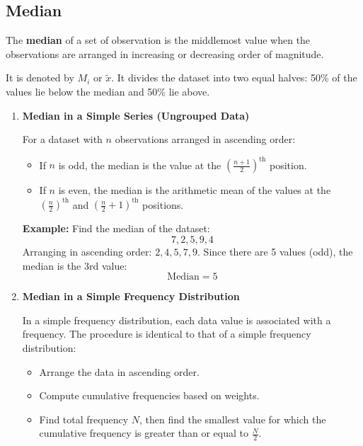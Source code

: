 \documentclass[twoside]{book}
\begin{document}
\subsection{Median}
\begin{textbox}
The \textbf{median} of a set of observation is the middlemost value when the observations are arranged in increasing or decreasing order of magnitude. 
    \end{textbox}

It is denoted by $M_i$ or $\tilde{x}$. It divides the dataset into two equal halves: 50\% of the values lie below the median and 50\% lie above.


\begin{enumerate}

\item \textbf{Median in a Simple Series (Ungrouped Data)}

For a dataset with \( n \) observations arranged in ascending order:

\begin{itemize}
    \item If \( n \) is odd, the median is the value at the \( \left( \frac{n + 1}{2} \right)^\text{th} \) position.
    \item If \( n \) is even, the median is the arithmetic mean of the values at the \( \left( \frac{n}{2} \right)^\text{th} \) and \( \left( \frac{n}{2} + 1 \right)^\text{th} \) positions.
\end{itemize}

\textbf{Example:} Find the median of the dataset:  
\[
7, 2, 5, 9, 4
\]  
Arranging in ascending order: \( 2, 4, 5, 7, 9 \).  
Since there are 5 values (odd), the median is the 3rd value:  
\[
\text{Median} = 5
\]

\item \textbf{Median in a Simple Frequency Distribution}

In a simple frequency distribution, each data value is associated with a frequency. The procedure is identical to that of a simple frequency distribution:

\begin{itemize}
    \item Arrange the data in ascending order.
    \item Compute cumulative frequencies based on weights.
    \item Find total frequency \( N \), then find the smallest value for which the cumulative frequency is greater than or equal to \( \frac{N}{2} \).
\end{itemize}


\end{enumerate}
\end{document}
